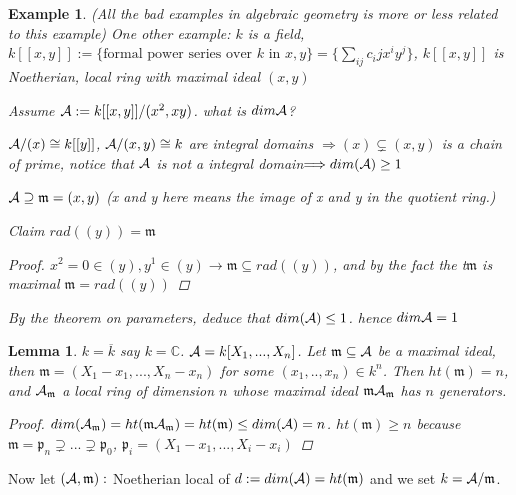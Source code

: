 \documentclass[11pt]{article}
\newtheorem{lemma}[thm]{Lemma}
\newtheorem{ex}[thm]{Example}
\newcommand{\cplx}{\mathbb C}
\newcommand{\scm}{{\mathfrak m}}
\newcommand{\scp}{{\mathfrak p}}
\newcommand{\cala}{{\cal A}}
\newcommand{\rta}{\rightarrow}
\newcommand{\Lrta}{\Longrightarrow}
\begin{document}
\begin{ex}(All the bad examples in algebraic geometry is more or less related to this example)
One other example: $k$ is a field, $k[[x,y]]:=\{\text{formal power series over $k$ in $x,y$}\}=\{\sum_{ij}c_ij x^i y^j\}$, $k[[x,y]]$ is Noetherian, local ring with maximal ideal $(x,y)$

Assume $\cala:=k[[x,y]]/(x^2,xy)$. what is  $dim\cala$?

$\cala/(x)\cong k[[y]]$, $\cala/(x,y)\cong k$ are integral domains $\Lrta (x)\subsetneq (x,y)$ is a chain of prime, notice that $\cala$ is not a integral domain$\Lrta dim(\cala)\geq 1$

$\cala\supseteq \scm=(x,y)$ (x and y here means the image of x and y in the quotient ring.)

Claim $rad((y))=\scm$
\begin{proof}
$x^2=0\in(y), y^1\in(y)\rta \scm\subseteq rad((y))$, and by the fact the t$\scm $ is maximal $\scm=rad((y))$
\end{proof}
By the theorem on parameters, deduce that $dim(\cala)\leq 1$. hence $dim\cala=1$
\end{ex}

\begin{lemma}
$k=\overline{k}$ say $k=\cplx$. $\cala=k[X_1,...,X_n]$. Let $\scm\subseteq \cala$ be a maximal ideal, then $\scm=(X_1-x_1,...,X_n-x_n)$ for some $(x_1,..,x_n)\in k^n$. Then $ht(\scm)=n$, and $\cala_\scm$ a local ring of dimension $n$ whose maximal ideal $\scm\cala_\scm$ has $n$ generators.
\begin{proof}
$dim(\cala_\scm)=ht(\scm\cala_\scm)=ht(\scm)\leq dim(\cala)=n$. $ht(\scm)\geq n$ because $\scm=\scp_n\supsetneq ...\supsetneq \scp_0$, $\scp_i=(X_1-x_1,...,X_i-x_i)$ 
\end{proof}
\end{lemma}

Now let $(\cala,\scm):$ Noetherian local of $d:=dim(\cala)=ht(\scm)$ and we set $k=\cala/\scm$.
\end{document}
